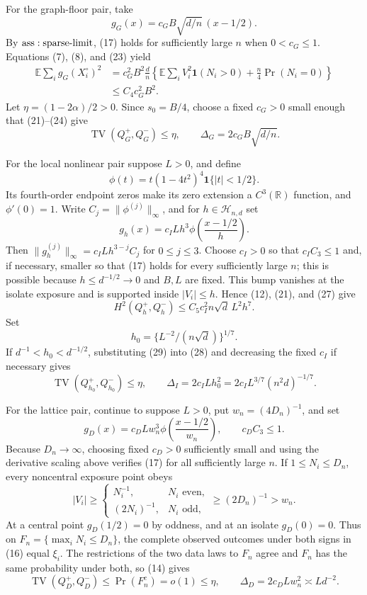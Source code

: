 For the graph-floor pair, take
\[
 g_G(x)=c_GB\sqrt{d/n}\,(x-1/2).
\tag{23}
\]
By \({\rm ass:sparse\text{-}limit}\), (17) holds for sufficiently large \(n\) when \(0<c_G\leq1\).  Equations (7), (8), and (23) yield
\[
\begin{aligned}
 \mathbb E\sum_i g_G(X_i^\circ)^2
 &=c_G^2B^2\frac dn
 \left\{\mathbb E\sum_iV_i^2\mathbf1(N_i>0)
 +\frac n4\Pr(N_i=0)\right\}\\
 &\leq C_4c_G^2B^2.
\end{aligned}
\tag{24}
\]
Let \(\eta=(1-2\alpha)/2>0\).  Since \(s_0=B/4\), choose a fixed \(c_G>0\) small enough that (21)--(24) give
\[
 \operatorname{TV}(Q_G^+,Q_G^-)\leq\eta,
 \qquad \Delta_G=2c_GB\sqrt{d/n}.
\tag{25}
\]

For the local nonlinear pair suppose \(L>0\), and define
\[
 \phi(t)=t(1-4t^2)^4\mathbf1\{|t|<1/2\}.
\tag{26}
\]
Its fourth-order endpoint zeros make its zero extension a \(C^3(\mathbb R)\) function, and \(\phi'(0)=1\).  Write \(C_j=\|\phi^{(j)}\|_\infty\), and for \(h\in\mathcal H_{n,d}\) set
\[
 g_h(x)=c_ILh^3\phi\!\left(\frac{x-1/2}{h}\right).
\tag{27}
\]
Then \(\|g_h^{(j)}\|_\infty=c_ILh^{3-j}C_j\) for \(0\leq j\leq3\).  Choose \(c_I>0\) so that \(c_IC_3\leq1\) and, if necessary, smaller so that (17) holds for every sufficiently large \(n\); this is possible because \(h\leq d^{-1/2}\to0\) and \(B,L\) are fixed.  This bump vanishes at the isolate exposure and is supported inside \(|V_i|\leq h\).  Hence (12), (21), and (27) give
\[
 H^2(Q_h^+,Q_h^-)
 \leq C_5c_I^2n\sqrt d\,L^2h^7.
\tag{28}
\]
Set
\[
 h_0=\{L^{-2}/(n\sqrt d)\}^{1/7}.
\tag{29}
\]
If \(d^{-1}<h_0<d^{-1/2}\), substituting (29) into (28) and decreasing the fixed \(c_I\) if necessary gives
\[
 \operatorname{TV}(Q_{h_0}^+,Q_{h_0}^-)\leq\eta,
 \qquad \Delta_I=2c_ILh_0^2=2c_IL^{3/7}(n^2d)^{-1/7}.
\tag{30}
\]

For the lattice pair, continue to suppose \(L>0\), put \(w_n=(4D_n)^{-1}\), and set
\[
 g_D(x)=c_DLw_n^3\phi\!\left(\frac{x-1/2}{w_n}\right),
 \qquad c_DC_3\leq1.
\tag{31}
\]
Because \(D_n\to\infty\), choosing fixed \(c_D>0\) sufficiently small and using the derivative scaling above verifies (17) for all sufficiently large \(n\).  If \(1\leq N_i\leq D_n\), every noncentral exposure point obeys
\[
 |V_i|\geq
 \begin{cases}N_i^{-1},&N_i\text{ even},\\(2N_i)^{-1},&N_i\text{ odd},\end{cases}
 \geq(2D_n)^{-1}>w_n.
\tag{32}
\]
At a central point \(g_D(1/2)=0\) by oddness, and at an isolate \(g_D(0)=0\).  Thus on \(F_n=\{\max_iN_i\leq D_n\}\), the complete observed outcomes under both signs in (16) equal \(\xi_i\).  The restrictions of the two data laws to \(F_n\) agree and \(F_n\) has the same probability under both, so (14) gives
\[
 \operatorname{TV}(Q_D^+,Q_D^-)\leq\Pr(F_n^c)=o(1)\leq\eta,
 \qquad \Delta_D=2c_DLw_n^2\asymp Ld^{-2}.
\tag{33}
\]

